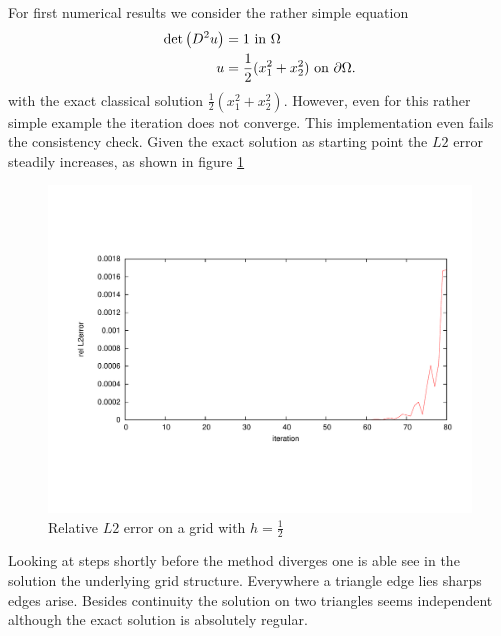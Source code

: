 For first numerical results we consider the rather simple equation
\begin{align}
	\det{\left(D^2 u\right)} &= 1 \text{ in } \Omega \\ 
	u &= \frac 1 2 (x_1^2 + x_2^2 )\text{ on }\partial \Omega.	
\end{align}
with the exact classical solution $\frac 1 2 (x_1^2 + x_2^2 )$. However, even for this rather simple example the iteration does not converge. This implementation even fails the consistency check. Given the exact solution as starting point the $L2$ error steadily increases, as shown in figure \ref{fig: consisctency_first_try}
\begin{figure}[h]
	\centering
	\includegraphics[trim = 2cm 4cm 1cm 4cm, width=1\textwidth]{plots/consisctency_first_try.pdf}
	\caption{Relative $L2$ error on a grid with $h=\frac 1 2$}
	\label{fig: consisctency_first_try}
\end{figure}
Looking at steps shortly before the method diverges one is able see in the solution the underlying grid structure. Everywhere a triangle edge lies sharps edges arise. Besides continuity the solution on two triangles seems independent although the exact solution is absolutely  regular.

